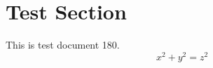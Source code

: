 \documentclass{article}
\begin{document}
\section{Test Section}
This is test document 180.
\begin{equation}
x^2 + y^2 = z^2
\end{equation}
\end{document}
